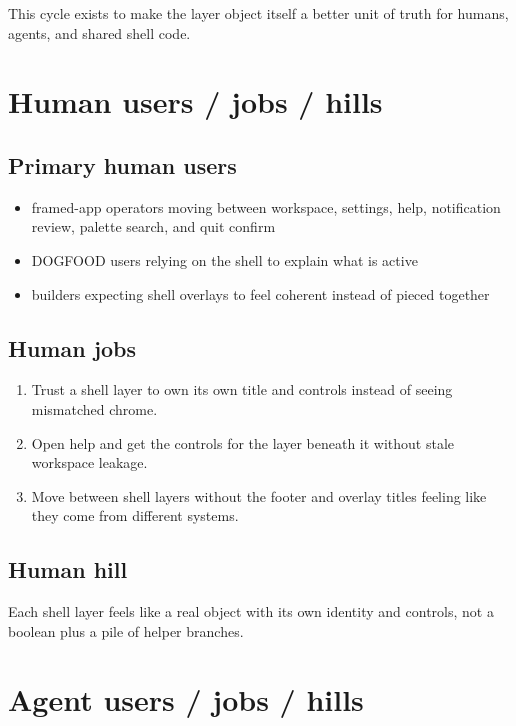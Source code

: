 This cycle exists to make the layer object itself a better unit of truth for humans, agents, and shared shell code.

\section{Human users / jobs / hills}\label{record-256-human-users-jobs-hills}

\subsection{Primary human users}\label{record-256-primary-human-users}

\begin{itemize}
\tightlist
\item
  framed-app operators moving between workspace, settings, help, notification review, palette search, and quit confirm
\item
  DOGFOOD users relying on the shell to explain what is active
\item
  builders expecting shell overlays to feel coherent instead of pieced together
\end{itemize}

\subsection{Human jobs}\label{record-256-human-jobs}

\begin{enumerate}
\def\labelenumi{\arabic{enumi}.}
\tightlist
\item
  Trust a shell layer to own its own title and controls instead of seeing mismatched chrome.
\item
  Open help and get the controls for the layer beneath it without stale workspace leakage.
\item
  Move between shell layers without the footer and overlay titles feeling like they come from different systems.
\end{enumerate}

\subsection{Human hill}\label{record-256-human-hill}

Each shell layer feels like a real object with its own identity and controls, not a boolean plus a pile of helper branches.

\section{Agent users / jobs / hills}\label{record-256-agent-users-jobs-hills}

